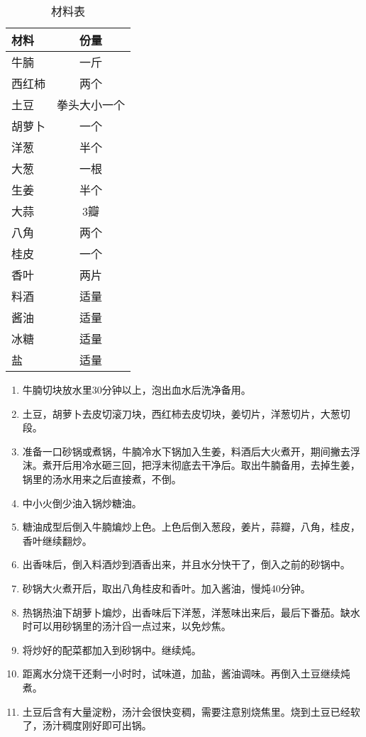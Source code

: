 \begin{table}[H]
    \centering
    \begin{tabular}{|l||c|}\hline
     \textbf{材料}    &  \textbf{份量}\\ \hline\hline
    牛腩    &  一斤 \\ \hline
    西红柿    & 两个 \\ \hline
    土豆 & 拳头大小一个 \\ \hline
    胡萝卜 & 一个\\ \hline
    洋葱 & 半个\\ \hline
    大葱 & 一根\\ \hline
    生姜 & 半个\\ \hline
    大蒜 & 3瓣\\ \hline
    八角 & 两个\\ \hline
    桂皮 & 一个\\ \hline
    香叶 & 两片\\ \hline
    料酒 &   适量\\ \hline
    酱油 & 适量 \\ \hline
    冰糖  &  适量\\ \hline
    盐  &  适量\\ \hline
    \end{tabular}
    \caption{材料表}
\end{table}

\begin{enumerate}
    \item 牛腩切块放水里30分钟以上，泡出血水后洗净备用。
    \item 土豆，胡萝卜去皮切滚刀块，西红柿去皮切块，姜切片，洋葱切片，大葱切段。
    \item 准备一口砂锅或煮锅，牛腩冷水下锅加入生姜，料酒后大火煮开，期间撇去浮沫。煮开后用冷水砸三回，把浮末彻底去干净后。取出牛腩备用，去掉生姜，锅里的汤水用来之后直接煮，不倒。
    \item 中小火倒少油入锅炒糖油。
    \item 糖油成型后倒入牛腩煸炒上色。上色后倒入葱段，姜片，蒜瓣，八角，桂皮，香叶继续翻炒。
    \item 出香味后，倒入料酒炒到酒香出来，并且水分快干了，倒入之前的砂锅中。
    \item 砂锅大火煮开后，取出八角桂皮和香叶。加入酱油，慢炖40分钟。
    \item 热锅热油下胡萝卜煸炒，出香味后下洋葱，洋葱味出来后，最后下番茄。缺水时可以用砂锅里的汤汁舀一点过来，以免炒焦。
    \item 将炒好的配菜都加入到砂锅中。继续炖。
    \item 距离水分烧干还剩一小时时，试味道，加盐，酱油调味。再倒入土豆继续炖煮。
    \item 土豆后含有大量淀粉，汤汁会很快变稠，需要注意别烧焦里。烧到土豆已经软了，汤汁稠度刚好即可出锅。
\end{enumerate}


